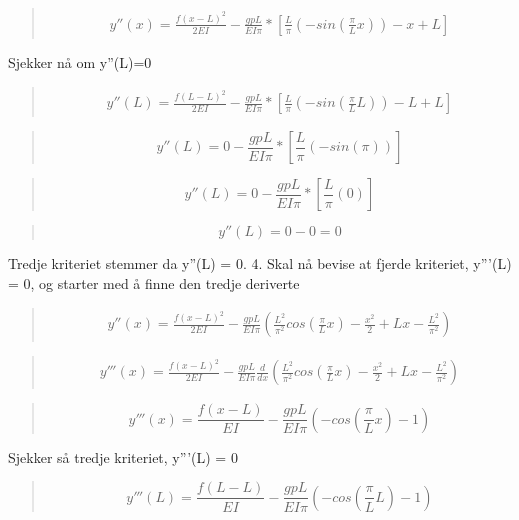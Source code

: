 \begin{quote}
\begin{multline}
y''(x) = \frac{f(x-L)^2}{2EI} - \frac{gpL}{EI\pi}* [\frac{L}{\pi} (-sin(\frac{\pi}{L}x)) - x + L]
\end{multline}
\end{quote}
Sjekker nå om y''(L)=0
\begin{quote}
\begin{multline}
y''(L) = \frac{f(L-L)^2}{2EI} - \frac{gpL}{EI\pi}* [\frac{L}{\pi} (-sin(\frac{\pi}{L}L)) - L + L]
\end{multline}
\end{quote}

\begin{quote}
\begin{equation*}
y''(L) = 0 - \frac{gpL}{EI\pi}* [\frac{L}{\pi} (-sin(\pi)) ]
\end{equation*}
\end{quote}

\begin{quote}
\begin{equation*}
y''(L) = 0 - \frac{gpL}{EI\pi}* [\frac{L}{\pi} (0) ]
\end{equation*}
\end{quote}

\begin{quote}
\begin{equation*}
y''(L) = 0 - 0 = 0
\end{equation*}
\end{quote}
Tredje kriteriet stemmer da y''(L) = 0.
4. Skal nå bevise at fjerde kriteriet, y'''(L) = 0, og starter med å finne den tredje deriverte
\begin{quote}
\begin{multline*}
y''(x) = \frac{f(x-L)^2}{2EI} - \frac{gpL}{EI\pi}(\frac{L^2}{\pi^2} cos(\frac{\pi}{L}x) - \frac{x^2}{2} + Lx - \frac{L^2}{\pi^2})
\end{multline*}
\end{quote}

\begin{quote}
\begin{multline*}
y'''(x) = \frac{f(x-L)^2}{2EI} - \frac{gpL}{EI\pi} \frac{d}{dx}(\frac{L^2}{\pi^2} cos(\frac{\pi}{L}x) - \frac{x^2}{2} + Lx - \frac{L^2}{\pi^2})
\end{multline*}
\end{quote}

\begin{quote}
\begin{equation}
y'''(x) = \frac{f(x-L)}{EI} - \frac{gpL}{EI\pi} (-cos(\frac{\pi}{L}x) - 1)
\end{equation}
\end{quote}
Sjekker så tredje kriteriet, y'''(L) = 0
\begin{quote}
\begin{equation*}
y'''(L) = \frac{f(L-L)}{EI} - \frac{gpL}{EI\pi} (-cos(\frac{\pi}{L}L) - 1)
\end{equation*}
\end{quote}

